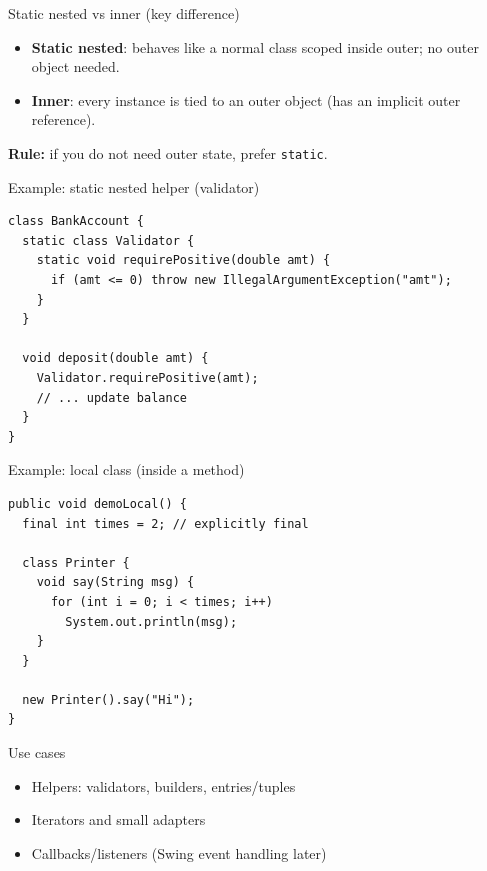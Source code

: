 \documentclass{beamer}
\begin{document}
\begin{frame}{Static nested vs inner (key difference)}
  \begin{itemize}[<+->]
    \item \textbf{Static nested}: behaves like a normal class scoped inside outer; no outer object needed.
    \item \textbf{Inner}: every instance is tied to an outer object (has an implicit outer reference).
  \end{itemize}
  \vspace{0.6em}
  \textbf{Rule:} if you do not need outer state, prefer \texttt{static}.
  \slidesources{\OOPSUnitIIISources}
\end{frame}

\begin{frame}[fragile]{Example: static nested helper (validator)}
\begin{lstlisting}
class BankAccount {
  static class Validator {
    static void requirePositive(double amt) {
      if (amt <= 0) throw new IllegalArgumentException("amt");
    }
  }

  void deposit(double amt) {
    Validator.requirePositive(amt);
    // ... update balance
  }
}
\end{lstlisting}
  \slidesources{\OOPSUnitIIISources}
\end{frame}

\begin{frame}[fragile]{Example: local class (inside a method)}
\begin{lstlisting}
public void demoLocal() {
  final int times = 2; // explicitly final

  class Printer {
    void say(String msg) {
      for (int i = 0; i < times; i++)
        System.out.println(msg);
    }
  }

  new Printer().say("Hi");
}
\end{lstlisting}
  \slidesources{\OOPSUnitIIISources}
\end{frame}

\begin{frame}{Use cases}
  \begin{itemize}[<+->]
    \item Helpers: validators, builders, entries/tuples
    \item Iterators and small adapters
    \item Callbacks/listeners (Swing event handling later)
  \end{itemize}
  \slidesources{\OOPSUnitIIISources}
\end{frame}
\end{document}
